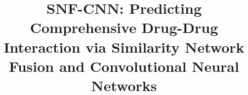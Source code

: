 \documentclass[unnumsec,webpdf,contemporary,large]{oup-authoring-template}%
\theoremstyle{thmstyleone}%
\theoremstyle{thmstyletwo}%
\theoremstyle{thmstylethree}%
\begin{document}



\title[Short Article Title]{SNF-CNN: Predicting Comprehensive Drug-Drug Interaction via Similarity Network Fusion and Convolutional Neural Networks}




\end{document}
